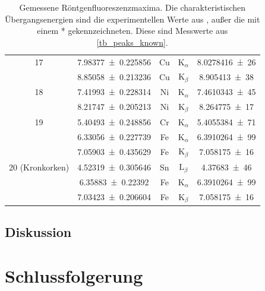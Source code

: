 \documentclass[
	a4paper,
	12pt,
	pagesize,
	ngerman
]{scrartcl}
\begin{document}
\begin{table}[H]
{\begin{tabular}{ c | c || c | c | c }
			17 
			& \SI{7.98377+-0.225856}{} & Cu & $\text{K}_\alpha$ & \SI{8,0278416(26)}{} \\
			& \SI{8.85058+-0.213236}{} & Cu & $\text{K}_\beta$ & \SI{8,905413(38)}{} \\ 
			\hline
			
			18 
			& \SI{7.41993+-0.228314}{} & Ni & $\text{K}_\alpha$ & \SI{7,4610343(45)}{} \\
			& \SI{8.21747+-0.205213}{} & Ni & $\text{K}_\beta$ &   \SI{8,264775(17)}{} \\ 
			\hline
			
			19 
			& \SI{5.40493+-0.248856}{} & Cr & $\text{K}_\alpha$ & \SI{5,4055384(71)}{} \\
			& \SI{6.33056+-0.227739}{} & Fe & $\text{K}_\alpha$ & \SI{ 6,3910264(99)}{} \\
			& \SI{7.05903+-0.435629}{} & Fe &  $\text{K}_\beta $ & \SI{7,058175(16)}{} \\ 
			\hline
			
			20 (Kronkorken) 
			& \SI{4.52319+-0.305646}{} & Sn & $\text{L}_\beta $ &  \SI{4,37683(46)}{} \\ %
			& \SI{6.35883+-0.22392}{} & Fe & $\text{K}_\alpha $ &  \SI{6,3910264(99)}{} \\
			& \SI{7.03423+-0.206604}{} & Fe & $\text{K}_\beta $ &  \SI{7,058175(16)}{} \\ 
			\hline
		\end{tabular}
		}
		\caption{Gemessene Röntgenfluoreszenzmaxima. Die charakteristischen Übergangsenergien sind die experimentellen Werte aus \cite{XRAYDB}, außer die mit einem * gekennzeichneten. Diese sind Messwerte aus \cref{tb_peaks_known}.}
		\label{tb_peaks_unknown}
		
	\end{table}
	
	\subsection{Diskussion}
	
	\section{Schlussfolgerung}
	
	
	\printbibliography
\end{document}
